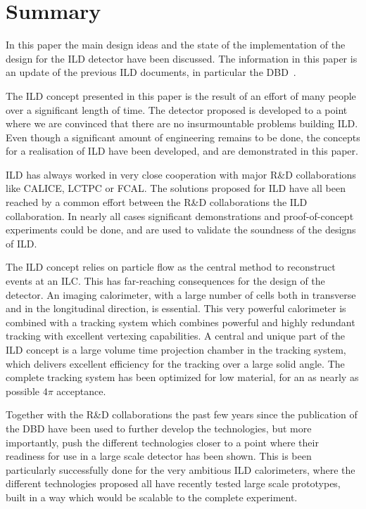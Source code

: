 \chapter{Summary}

In this paper the main design ideas and the state of the implementation of the design for the ILD detector have been discussed. The information in this paper is an update of the previous ILD documents, in particular the DBD~\cite{ild:bib:ilddbd}. 

The ILD concept presented in this paper is the result of an effort of many people over a significant length of time. The detector proposed is developed to a point where we are convinced that there are no insurmountable problems building ILD. Even though a significant amount of engineering remains to be done, the concepts for a realisation of ILD have been developed, and are demonstrated in this paper. 

ILD has always worked in very close cooperation with major R\&D collaborations like CALICE, LCTPC or FCAL. The solutions proposed for ILD have all been reached by a common effort between the R\&D collaborations the ILD collaboration. In nearly all cases significant demonstrations and proof-of-concept experiments could be done, and are used to validate the soundness of the designs of ILD. 

The ILD concept relies on particle flow as the central method to reconstruct events at an ILC. This has far-reaching consequences for the design of the detector. An imaging calorimeter, with a large number of cells both in transverse and in the longitudinal direction, is essential. This very powerful calorimeter is combined with a tracking system which combines powerful and highly redundant tracking with excellent vertexing capabilities. A central and unique part of the ILD concept is a large volume time projection chamber in the tracking system, which delivers excellent efficiency for the tracking over a large solid angle. The complete tracking system has been optimized for low material, for an as nearly as possible $4 \pi$ acceptance.

Together with the R\&D collaborations the past few years since the publication of the DBD have been used to further develop the technologies, but more importantly, push the different technologies closer to a point where their readiness for use in a large scale detector has been shown. This is been particularly successfully done for the very ambitious ILD calorimeters, where the different technologies proposed all have recently tested large scale prototypes, built in a way which would be scalable to the complete experiment. 


